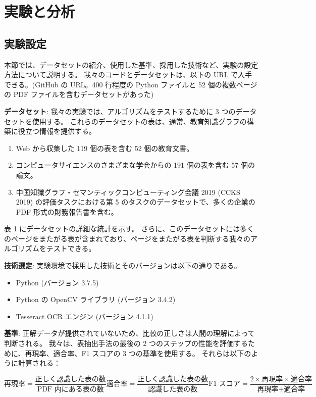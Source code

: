 \documentclass[uplatex, twocolumn,10pt]{jsarticle}
\begin{document}


\section{実験と分析}

\subsection{実験設定}
本節では、データセットの紹介、使用した基準、採用した技術など、実験の設定方法について説明する。
我々のコードとデータセットは、以下の URL で入手できる。(GitHub の URL。400 行程度の Python ファイルと 52 個の複数ページの PDF ファイルを含むデータセットがあった)

\textbf{データセット}:
我々の実験では、アルゴリズムをテストするために 3 つのデータセットを使用する。
これらのデータセットの表は、通常、教育知識グラフの構築に役立つ情報を提供する。
\begin{enumerate}
    \item Web から収集した 119 個の表を含む 52 個の教育文書。
    \item コンピュータサイエンスのさまざまな学会からの 191 個の表を含む 57 個の論文。
    \item 中国知識グラフ・セマンティックコンピューティング会議 2019 (CCKS 2019) の評価タスクにおける第 5 のタスクのデータセットで、多くの企業の PDF 形式の財務報告書を含む。
\end{enumerate}
表 1 にデータセットの詳細な統計を示す。
さらに、このデータセットには多くのページをまたがる表が含まれており、ページをまたがる表を判断する我々のアルゴリズムをテストできる。

\textbf{技術選定}:
実験環境で採用した技術とそのバージョンは以下の通りである。
\begin{itemize}
    \item Python (バージョン 3.7.5)
    \item Python の OpenCV ライブラリ (バージョン 3.4.2)
    \item Tesseract OCR エンジン (バージョン 4.1.1)
\end{itemize}

\textbf{基準}:
正解データが提供されていないため、比較の正しさは人間の理解によって判断される。
我々は、表抽出手法の最後の 2 つのステップの性能を評価するために、再現率、適合率、F1 スコアの 3 つの基準を使用する。
それらは以下のように計算される：

\begin{equation}
    \text{再現率} = \frac{\text{正しく認識した表の数}}{\text{PDF 内にある表の数}}
    \text{適合率} = \frac{\text{正しく認識した表の数}}{\text{認識した表の数}}
    \text{F1 スコア} = \frac{2 \times \text{再現率} \times \text{適合率}}{\text{再現率} + \text{適合率}}
\end{equation}
\end{document}
